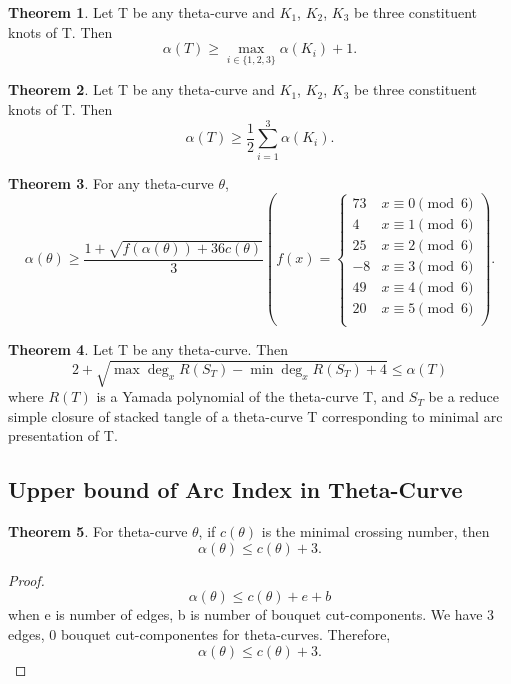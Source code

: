 \documentclass{article}
\theoremstyle{definition}
\theoremstyle{theorem}
\newtheorem{theorem}{Theorem}
\theoremstyle{proposition}
\theoremstyle{corollary}
\begin{document}
\begin{theorem}
Let T be any theta-curve and $K_1$, $K_2$, $K_3$ be three constituent knots of T. Then $$\alpha(T) \geq \underset{i \in \{1,2,3\}}\max \alpha(K_i) + 1.$$
\end{theorem}

\begin{theorem}
Let T be any theta-curve and $K_1$, $K_2$, $K_3$ be three constituent knots of T. Then $$\alpha(T) \geq \frac{1}{2}\sum_{i=1}^3\alpha(K_i).$$
\end{theorem}

\begin{theorem}
For any theta-curve $\theta$, $$\alpha(\theta)\geq\frac{1+\sqrt{f(\alpha(\theta))+36c(\theta)}}{3} \left(f(x) = \begin{cases} 
		73 & x \equiv 0 \pmod 6\\ 
		4 & x \equiv 1 \pmod 6\\ 
		25 & x \equiv 2 \pmod 6\\ 
		-8 & x \equiv 3 \pmod 6\\ 
		49 & x \equiv 4 \pmod 6\\ 
		20 & x \equiv 5 \pmod 6\\ 
     \end{cases} \right).$$
\end{theorem}

\begin{theorem}
Let T be any theta-curve. Then $$2+\sqrt{\max\deg_x R(S_T) - \min\deg_x R(S_T) + 4} \leq \alpha(T)$$ where $R(T)$ is a Yamada polynomial of the theta-curve T, and $S_{T}$ be a reduce simple closure of stacked tangle of a theta-curve T corresponding to minimal arc presentation of T.
\end{theorem}

\subsection{Upper bound of Arc Index in Theta-Curve}

\begin{theorem}
For theta-curve $\theta$, if $c(\theta)$ is the minimal crossing number, then $$\alpha(\theta) \leq c(\theta) + 3.$$
\end{theorem}

\begin{proof}
$$\alpha(\theta) \leq c(\theta) + e + b$$ when e is number of edges, b is number of bouquet cut-components. We have 3 edges, 0 bouquet cut-componentes for theta-curves. Therefore, $$\alpha(\theta) \leq c(\theta) + 3.$$
\end{proof}
\end{document}
